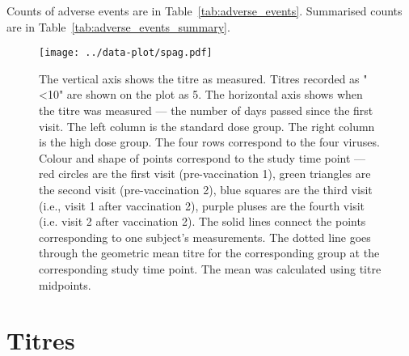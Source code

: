 \documentclass[11pt]{article}
\begin{document}
Counts of adverse events are in Table~\ref{tab:adverse_events}. Summarised
counts are in Table~\ref{tab:adverse_events_summary}.


























\begin{figure}[htp]
  \centering
  \texttt{[image: ../data-plot/spag.pdf]}
  \caption{
    The vertical axis shows the titre as measured.
    Titres recorded as "<10" are shown on the plot as 5.
    The horizontal axis shows when the titre was measured --- the number of
    days passed since the first visit.
    The left column is the standard dose group.
    The right column is the high dose group.
    The four rows correspond to the four viruses.
    Colour and shape of points correspond to the study time point ---
    red circles are the first visit (pre-vaccination 1),
    green triangles are the second visit (pre-vaccination 2),
    blue squares are the third visit (i.e., visit 1 after vaccination 2),
    purple pluses are the fourth visit (i.e. visit 2 after vaccination 2).
    The solid lines connect the points
    corresponding to one subject's measurements.
    The dotted line goes through the geometric mean titre for the
    corresponding group at the corresponding study time point. The mean was
    calculated using titre midpoints.
  }
  \label{fig:spag}
\end{figure}

\section{Titres}
\end{document}
